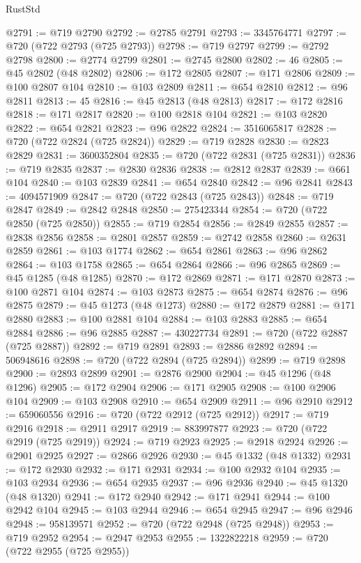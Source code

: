 \begin{lexlean}{RustStd}
\begin{coremodule}
@2791 := @719 @2790
@2792 := @2785 @2791
@2793 := 3345764771
@2797 := @720 (@722 @2793 (@725 @2793))
@2798 := @719 @2797
@2799 := @2792 @2798
@2800 := @2774 @2799
@2801 := @2745 @2800
@2802 := 46
@2805 := @45 @2802 (@48 @2802)
@2806 := @172 @2805
@2807 := @171 @2806
@2809 := @100 @2807 @104
@2810 := @103 @2809
@2811 := @654 @2810
@2812 := @96 @2811
@2813 := 45
@2816 := @45 @2813 (@48 @2813)
@2817 := @172 @2816
@2818 := @171 @2817
@2820 := @100 @2818 @104
@2821 := @103 @2820
@2822 := @654 @2821
@2823 := @96 @2822
@2824 := 3516065817
@2828 := @720 (@722 @2824 (@725 @2824))
@2829 := @719 @2828
@2830 := @2823 @2829
@2831 := 3600352804
@2835 := @720 (@722 @2831 (@725 @2831))
@2836 := @719 @2835
@2837 := @2830 @2836
@2838 := @2812 @2837
@2839 := @661 @104
@2840 := @103 @2839
@2841 := @654 @2840
@2842 := @96 @2841
@2843 := 4094571909
@2847 := @720 (@722 @2843 (@725 @2843))
@2848 := @719 @2847
@2849 := @2842 @2848
@2850 := 275423344
@2854 := @720 (@722 @2850 (@725 @2850))
@2855 := @719 @2854
@2856 := @2849 @2855
@2857 := @2838 @2856
@2858 := @2801 @2857
@2859 := @2742 @2858
@2860 := @2631 @2859
@2861 := @103 @1774
@2862 := @654 @2861
@2863 := @96 @2862
@2864 := @103 @1758
@2865 := @654 @2864
@2866 := @96 @2865
@2869 := @45 @1285 (@48 @1285)
@2870 := @172 @2869
@2871 := @171 @2870
@2873 := @100 @2871 @104
@2874 := @103 @2873
@2875 := @654 @2874
@2876 := @96 @2875
@2879 := @45 @1273 (@48 @1273)
@2880 := @172 @2879
@2881 := @171 @2880
@2883 := @100 @2881 @104
@2884 := @103 @2883
@2885 := @654 @2884
@2886 := @96 @2885
@2887 := 430227734
@2891 := @720 (@722 @2887 (@725 @2887))
@2892 := @719 @2891
@2893 := @2886 @2892
@2894 := 506948616
@2898 := @720 (@722 @2894 (@725 @2894))
@2899 := @719 @2898
@2900 := @2893 @2899
@2901 := @2876 @2900
@2904 := @45 @1296 (@48 @1296)
@2905 := @172 @2904
@2906 := @171 @2905
@2908 := @100 @2906 @104
@2909 := @103 @2908
@2910 := @654 @2909
@2911 := @96 @2910
@2912 := 659060556
@2916 := @720 (@722 @2912 (@725 @2912))
@2917 := @719 @2916
@2918 := @2911 @2917
@2919 := 883997877
@2923 := @720 (@722 @2919 (@725 @2919))
@2924 := @719 @2923
@2925 := @2918 @2924
@2926 := @2901 @2925
@2927 := @2866 @2926
@2930 := @45 @1332 (@48 @1332)
@2931 := @172 @2930
@2932 := @171 @2931
@2934 := @100 @2932 @104
@2935 := @103 @2934
@2936 := @654 @2935
@2937 := @96 @2936
@2940 := @45 @1320 (@48 @1320)
@2941 := @172 @2940
@2942 := @171 @2941
@2944 := @100 @2942 @104
@2945 := @103 @2944
@2946 := @654 @2945
@2947 := @96 @2946
@2948 := 958139571
@2952 := @720 (@722 @2948 (@725 @2948))
@2953 := @719 @2952
@2954 := @2947 @2953
@2955 := 1322822218
@2959 := @720 (@722 @2955 (@725 @2955))

\end{coremodule}
\end{lexlean}
